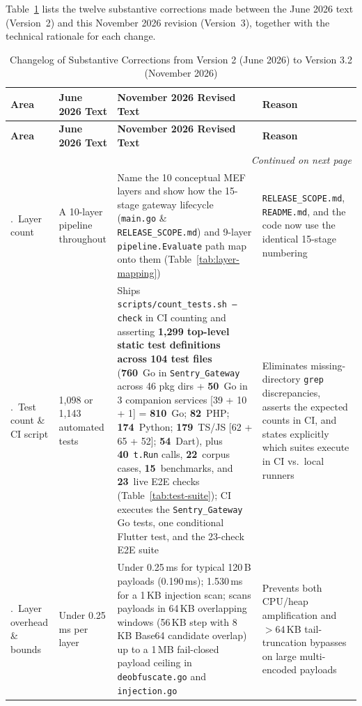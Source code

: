 \documentclass[11pt, a4paper]{article}
\begin{document}
Table~\ref{tab:changelog} lists the twelve substantive corrections made between the June 2026 text (Version~2) and this November 2026 revision (Version~3), together with the technical rationale for each change.

\begin{small}
\begin{longtable}{@{} p{2.6cm} p{3.6cm} p{5.2cm} p{4.0cm} @{}}
\caption{Changelog of Substantive Corrections from Version 2 (June 2026) to Version 3.2 (November 2026)}
\label{tab:changelog} \\
\toprule
\textbf{Area} & \textbf{June 2026 Text} & \textbf{November 2026 Revised Text} & \textbf{Reason} \\
\midrule
\endfirsthead
\toprule
\textbf{Area} & \textbf{June 2026 Text} & \textbf{November 2026 Revised Text} & \textbf{Reason} \\
\midrule
\endhead
\midrule
\multicolumn{4}{r}{\textit{Continued on next page}} \\
\bottomrule
\endfoot
\bottomrule
\endlastfoot
1.~Layer count & A 10-layer pipeline throughout & Name the 10 conceptual MEF layers and show how the 15-stage gateway lifecycle (\texttt{main.go} \& \texttt{RELEASE\_SCOPE.md}) and 9-layer \texttt{pipeline.Evaluate} path map onto them (Table~\ref{tab:layer-mapping}) & \texttt{RELEASE\_SCOPE.md}, \texttt{README.md}, and the code now use the identical 15-stage numbering \\
\addlinespace
2.~Test count \& CI script & 1,098 or 1,143 automated tests & Ships \texttt{scripts/count\_tests.sh --check} in CI counting and asserting \textbf{1,299 top-level static test definitions across 104 test files} (\textbf{760}~Go in \texttt{Sentry\_Gateway} across 46 pkg dirs + \textbf{50}~Go in 3 companion services [39 + 10 + 1] = \textbf{810}~Go; \textbf{82}~PHP; \textbf{174}~Python; \textbf{179}~TS/JS [62 + 65 + 52]; \textbf{54}~Dart), plus \textbf{40}~\texttt{t.Run} calls, \textbf{22}~corpus cases, \textbf{15}~benchmarks, and \textbf{23}~live E2E checks (Table~\ref{tab:test-suite}); CI executes the \texttt{Sentry\_Gateway} Go tests, one conditional Flutter test, and the 23-check E2E suite & Eliminates missing-directory \texttt{grep} discrepancies, asserts the expected counts in CI, and states explicitly which suites execute in CI vs.\ local runners \\
\addlinespace
3.~Layer overhead \& bounds & Under 0.25\,ms per layer & Under 0.25\,ms for typical 120\,B payloads (0.190\,ms); 1.530\,ms for a 1\,KB injection scan; scans payloads in 64\,KB overlapping windows (56\,KB step with 8\,KB Base64 candidate overlap) up to a 1\,MB fail-closed payload ceiling in \texttt{deobfuscate.go} and \texttt{injection.go} & Prevents both CPU/heap amplification and $>64\,$KB tail-truncation bypasses on large multi-encoded payloads \\

\end{longtable}
\end{small}
\end{document}
